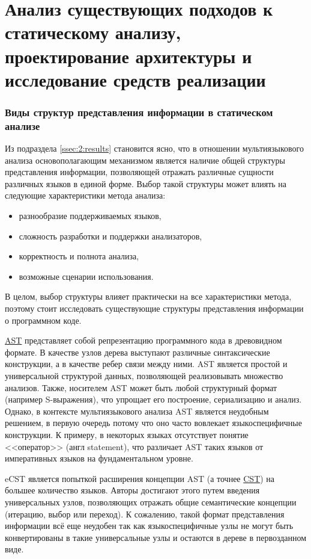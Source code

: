 \section{Анализ существующих подходов к статическому анализу, проектирование архитектуры и
исследование средств реализации}

\subsubsection{Виды структур представления информации в статическом анализе}

Из подраздела \ref{ssec:2:results} становится ясно, что в отношении мультиязыкового анализа
основополагающим механизмом является наличие общей структуры представления информации, позволяющей отражать различные
сущности различных языков в единой форме. Выбор такой структуры может влиять на следующие
характеристики метода анализа:
\begin{itemize}
    \item разнообразие поддерживаемых языков,
    \item сложность разработки и поддержки анализаторов,
    \item корректность и полнота анализа,
    \item возможные сценарии использования.
\end{itemize}
В целом, выбор структуры влияет практически на все характеристики метода, поэтому стоит
исследовать существующие структуры представления информации о программном коде.

\hyperlink{AST}{AST} представляет собой репрезентацию программного кода в древовидном формате. В качестве узлов дерева выступают различные синтаксические конструкции, а в качестве ребер связи между ними. AST является
простой и универсальной структурой данных, позволяющей реализовывать множество анализов. Также,
носителем AST может быть любой структурный формат (например S-выражения), что упрощает его
построение, сериализацию и анализ. Однако, в контексте мультиязыкового анализа AST является
неудобным решением, в первую очередь потому что оно часто вовлекает языкоспецифичные конструкции.
К примеру, в некоторых языках отсутствует понятие <<оператор>> (англ statement), что различает
AST таких языков от императивных языков на фундаментальном уровне.

eCST \cite{eCST} является попыткой расширения концепции AST (а точнее \hyperlink{CST}{CST}) на большее
количество языков. Авторы достигают этого путем введения универсальных узлов, позволяющих
отражать общие семантические концепции (итерацию, выбор или переход). К сожалению, такой формат
представления информации всё еще неудобен так как языкоспецифичные узлы не могут быть конвертированы
в такие универсальные узлы и остаются в дереве в первозданном виде.

